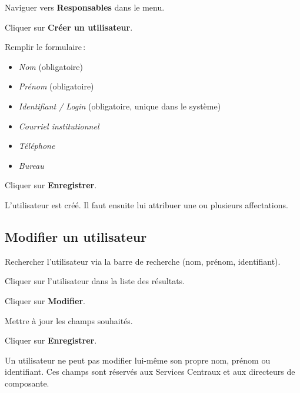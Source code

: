 \begin{steps}
  \item Naviguer vers \textbf{Responsables} dans le menu.
  \item Cliquer sur \textbf{Cr\'eer un utilisateur}.
  \item Remplir le formulaire\,:
    \begin{itemize}
      \item \textit{Nom} (obligatoire)
      \item \textit{Pr\'enom} (obligatoire)
      \item \textit{Identifiant / Login} (obligatoire, unique dans le syst\`eme)
      \item \textit{Courriel institutionnel}
      \item \textit{T\'el\'ephone}
      \item \textit{Bureau}
    \end{itemize}
  \item Cliquer sur \textbf{Enregistrer}.
  \item L'utilisateur est cr\'e\'e. Il faut ensuite lui attribuer une ou plusieurs affectations.
\end{steps}


\subsection{Modifier un utilisateur}

\begin{steps}
  \item Rechercher l'utilisateur via la barre de recherche (nom, pr\'enom, identifiant).
  \item Cliquer sur l'utilisateur dans la liste des r\'esultats.
  \item Cliquer sur \textbf{Modifier}.
  \item Mettre \`a jour les champs souhait\'es.
  \item Cliquer sur \textbf{Enregistrer}.
\end{steps}

\begin{notebox}
  Un utilisateur ne peut pas modifier lui-m\^eme son propre nom, pr\'enom ou identifiant. Ces champs sont r\'eserv\'es aux Services Centraux et aux directeurs de composante.
\end{notebox}

